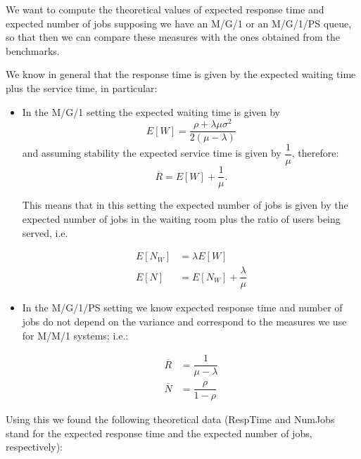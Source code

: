 \documentclass[11pt]{scrartcl} %
\begin{document}
We want to compute the theoretical values of expected response time and expected number of jobs supposing we have an M/G/1 or an M/G/1/PS queue, so that then we can compare these measures with the ones obtained from the benchmarks.

We know in general that the response time is given by the expected waiting time plus the service time, in particular:

\begin{itemize}
\item[\adforn{43}] In the M/G/1 setting the expected waiting time is given by $$E[W]=\dfrac{\rho+\lambda\mu\sigma^2}{2(\mu-\lambda)}$$ and assuming stability the expected service time is given by $\dfrac{1}{\mu}$, therefore:
$$\overline{R}=E[W]+\dfrac{1}{\mu} .$$

This means that in this setting the expected number of jobs is given by the expected number of jobs in the waiting room plus the ratio of users being served, i.e.

\begin{align*}
E[N_W] &= \lambda E[W]\\
E[N] &= E[N_W]+\dfrac{\lambda}{\mu}
\end{align*}

\item[\adforn{43}] In the M/G/1/PS setting we know expected response time and number of jobs do not depend on the variance and correspond to the measures we use for M/M/1 systems; i.e.:

\begin{align*}
\overline{R} &= \dfrac{1}{\mu-\lambda}\\
\overline{N} &= \dfrac{\rho}{1-\rho}
\end{align*}

\end{itemize}

Using this we found the following theoretical data (RespTime and NumJobs stand for the expected response time and the expected number of jobs, respectively):
\end{document}
